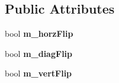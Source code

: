 \subsection*{Public Attributes}
\begin{DoxyCompactItemize}
\item 
\mbox{\label{class_game_object_a59738539e414c09e2704a4e72e84b62c}} 
bool {\bfseries m\+\_\+horz\+Flip}
\item 
\mbox{\label{class_game_object_ae228fe78c635f098771d135cae4d4864}} 
bool {\bfseries m\+\_\+diag\+Flip}
\item 
\mbox{\label{class_game_object_a17d31f67a3bbd6f43fb05a1902aa55e7}} 
bool {\bfseries m\+\_\+vert\+Flip}
\end{DoxyCompactItemize}
